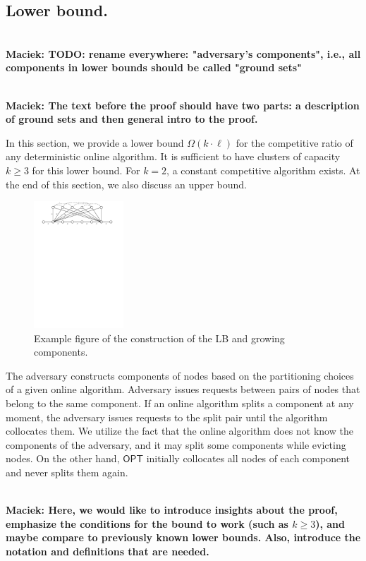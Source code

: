 \documentclass[manuscript,screen=true, review, anonymous]{acmart}
\newcommand{\OPT}{\textsf{OPT}\xspace}
\newcommand\maciek[1]{\color{brown}\textbf{\\ Maciek: #1}\color{black}}
\begin{document}
\subsection{Lower bound.}

\label{sec:lowerbound}

\maciek{TODO: rename everywhere: "adversary's components", i.e., all components in lower bounds should be called "ground sets"}

\maciek{The text before the proof should have two parts: a description of ground sets and then general intro to the proof.}

In this section, we provide a lower bound $\Omega(k\cdot \ell)$ for the competitive ratio of any deterministic online algorithm.
It is sufficient to have clusters of capacity $k\geq 3$ for this lower bound.
For $k=2$, a constant competitive algorithm exists.
At the end of this section, we also
discuss an upper bound.




\begin{figure}[H]
  \centering
    \includegraphics[width=0.3\textwidth]{figs/substitute}
    \caption{Example figure of the construction of the LB and growing components.}
    \label{fig:nptree-construction}
  \end{figure}


The adversary constructs components of nodes based on the partitioning choices of a given online algorithm.
Adversary issues requests between pairs of nodes that belong to the same component.
If an online algorithm splits a component at any moment,
the adversary issues requests to the split pair until the algorithm collocates them.
We utilize the fact that the online algorithm does not know the components of the adversary, and it may split some components while evicting nodes.
On the other hand, $\OPT$ initially collocates all nodes of each component and never splits them again.


\maciek{Here, we would like to introduce insights about the proof, emphasize the conditions for the bound to work (such as $k\geq 3$), and maybe compare to previously known lower bounds. Also, introduce the notation and definitions that are needed.}
\end{document}
